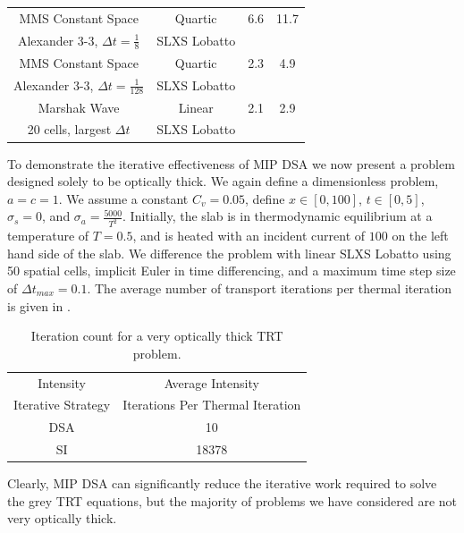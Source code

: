 \begin{table}[!htp]
\begin{tabular}{|c|c|c|c|}
\hline
MMS Constant Space 										& Quartic 				 & 6.6 & 11.7 \\
Alexander 3-3, $\Delta t=\frac{1}{8}$	& SLXS Lobatto 			& {}  & {} \\
\hline
MMS Constant Space 										& Quartic 				 & 2.3 & 4.9 \\
Alexander 3-3, $\Delta t=\frac{1}{128}$	& SLXS Lobatto 			& {}  & {} \\
\hline
Marshak Wave 									&  Linear			 & 2.1 & 2.9 \\
20 cells, largest $\Delta t$	& SLXS Lobatto & {} 		 & {} \\
\hline
\end{tabular}
\label{tbl:iteration_count}
\end{table}

To demonstrate the iterative effectiveness of MIP DSA we now present a problem designed solely to be optically thick.
We again define a dimensionless problem, $a=c=1$.
We assume a constant $C_v = 0.05$, define $x\in[0,100]$, $t\in[0,5]$, $\sigma_s = 0$, and $\sigma_a = \frac{5000}{T^2}$.
Initially, the slab is in thermodynamic equilibrium at a temperature of $T=0.5$, and is heated with an incident current of $100$ on the left hand side of the slab.
We difference the problem with linear SLXS Lobatto using 50 spatial cells, implicit Euler in time differencing, and a maximum time step size of $\Delta t_{max} = 0.1$.
The average number of transport iterations per thermal iteration is given in .
\begin{table}[!ht]
\centering
\caption{Iteration count for a very optically thick TRT problem.}
\label{tbl:high_iter_count}
\begin{tabular}{|c|c|}
\hline
Intensity  						& Average Intensity					\\				
Iterative Strategy		& Iterations Per Thermal Iteration \\
\hline
DSA		&   10  \\ 
\hline
SI  &   18378 \\
\hline
\end{tabular}
\end{table}
Clearly, MIP DSA can significantly reduce the iterative work required to solve the grey TRT equations, but the majority of problems we have considered are not very optically thick.

